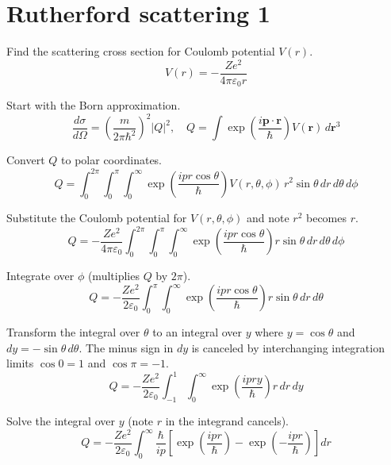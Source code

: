 


\section*{Rutherford scattering 1}

Find the scattering cross section for Coulomb potential $V(r)$.
\begin{equation*}
V(r)=-\frac{Ze^2}{4\pi\varepsilon_0r}
\end{equation*}

Start with the Born approximation.
\begin{equation*}
\frac{d\sigma}{d\Omega}=\left(\frac{m}{2\pi\hbar^2}\right)^2|Q|^2,\quad
Q=\int\exp\left(\frac{i\mathbf p\cdot\mathbf r}{\hbar}\right)V(\mathbf r)\,d\mathbf r^3
\end{equation*}

Convert $Q$ to polar coordinates.
\begin{equation*}
Q=\int_0^{2\pi}
\int_0^\pi
\int_0^\infty
\exp\left(\frac{ipr\cos\theta}{\hbar}\right)V(r,\theta,\phi)
\,r^2\sin\theta\,dr\,d\theta\,d\phi
\end{equation*}

Substitute the Coulomb potential for $V(r,\theta,\phi)$ and note $r^2$ becomes $r$.
\begin{equation*}
Q=-\frac{Ze^2}{4\pi\varepsilon_0}
\int_0^{2\pi}
\int_0^\pi
\int_0^\infty
\exp\left(\frac{ipr\cos\theta}{\hbar}\right)
r\sin\theta\,dr\,d\theta\,d\phi
\end{equation*}

Integrate over $\phi$ (multiplies $Q$ by $2\pi$).
\begin{equation*}
Q=-\frac{Ze^2}{2\varepsilon_0}
\int_0^\pi
\int_0^\infty
\exp\left(\frac{ipr\cos\theta}{\hbar}\right)
r\sin\theta\,dr\,d\theta
\end{equation*}

Transform the integral over $\theta$ to an integral over $y$
where $y=\cos\theta$ and $dy=-\sin\theta\,d\theta$.
The minus sign in $dy$ is canceled by interchanging integration limits
$\cos0=1$ and $\cos\pi=-1$.
\begin{equation*}
Q=-\frac{Ze^2}{2\varepsilon_0}
\int_{-1}^1
\int_0^\infty
\exp\left(\frac{ipry}{\hbar}\right)
r\,dr\,dy
\end{equation*}

Solve the integral over $y$ (note $r$ in the integrand cancels).
\begin{equation*}
Q=-\frac{Ze^2}{2\varepsilon_0}
\int_0^\infty
\frac{\hbar}{ip}
\left[\exp\left(\frac{ipr}{\hbar}\right)-\exp\left(-\frac{ipr}{\hbar}\right)\right]
dr
\end{equation*}

